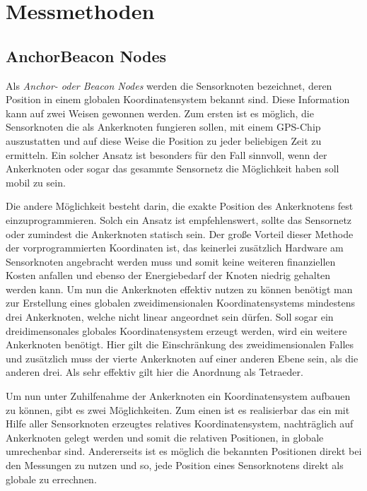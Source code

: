 \section{Messmethoden}
\subsection{Anchor\/Beacon Nodes}

Als \textit{Anchor- oder Beacon Nodes} werden die Sensorknoten
bezeichnet, deren Position in einem globalen Koordinatensystem bekannt
sind. Diese Information kann auf zwei Weisen gewonnen werden. Zum ersten ist
es möglich, die Sensorknoten die als Ankerknoten fungieren sollen, 
mit einem GPS-Chip auszustatten und auf diese Weise die Position zu
jeder beliebigen Zeit zu ermitteln. Ein solcher Ansatz ist besonders
für den Fall sinnvoll, wenn der Ankerknoten oder sogar das gesammte
Sensornetz die Möglichkeit haben soll mobil zu sein. 

Die andere Möglichkeit besteht darin, die exakte Position des Ankerknotens fest einzuprogrammieren. Solch ein Ansatz ist empfehlenswert,
sollte das Sensornetz oder zumindest die Ankerknoten statisch sein. Der große Vorteil dieser Methode der vorprogrammierten Koordinaten ist,
das keinerlei zusätzlich Hardware am Sensorknoten angebracht werden muss und somit keine weiteren finanziellen Kosten anfallen und ebenso der
Energiebedarf der Knoten niedrig gehalten werden kann.
Um nun die Ankerknoten effektiv nutzen zu können benötigt man zur Erstellung eines globalen zweidimensionalen Koordinatensystems mindestens
drei Ankerknoten, welche nicht linear angeordnet sein dürfen. Soll sogar ein dreidimensonales globales Koordinatensystem erzeugt werden, wird
ein weitere Ankerknoten benötigt. Hier gilt die Einschränkung des zweidimensionalen Falles und zusätzlich muss der vierte Ankerknoten auf einer
anderen Ebene sein, als die anderen drei. Als sehr effektiv gilt hier
die Anordnung als Tetraeder.

Um nun unter Zuhilfenahme der Ankerknoten ein Koordinatensystem
aufbauen zu können, gibt es zwei Möglichkeiten. Zum einen ist es
realisierbar das  
ein mit Hilfe aller Sensorknoten erzeugtes relatives
Koordinatensystem, nachträglich auf Ankerknoten gelegt werden und
somit die relativen Positionen, in globale umrechenbar sind.
Andererseits ist es möglich die bekannten Positionen direkt bei den
Messungen zu nutzen und so, jede Position eines Sensorknotens direkt
als globale zu errechnen.

